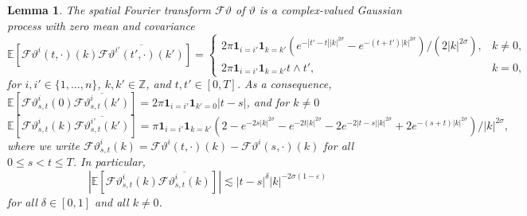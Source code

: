 \documentclass[11pt,a4paper]{article}
\newtheorem{lemma}[theorem]{Lemma}
\theoremstyle{remark}
\newcommand{\E}{\mathbb{E}}
\newcommand{\CF}{\ensuremath{\mathscr{F}}}
\begin{document}
\begin{lemma}\label{l:heat covariance}
   The spatial Fourier transform $\CF \vartheta$ of $\vartheta$ is a complex-valued Gaussian process with zero mean and covariance
   \begin{equation*}%
      \E[\CF{\vartheta}^i(t,\cdot)(k) \overline{\CF{\vartheta}^{i'}(t',\cdot)(k')}] = \begin{cases}
                                                                                                       2 \pi \mathbf{1}_{i=i'} \mathbf{1}_{k=k'} (e^{-|t'-t| | k |^{2 \sigma}} - e^{-(t+t')|k|^{2\sigma} })/(2|k|^{2 \sigma}), & k \neq 0,\\
                                                                                                       2\pi \mathbf{1}_{i=i'} \mathbf{1}_{k=k'} t \wedge t', & k = 0,
                                                                                                   \end{cases}
   \end{equation*}
   for $i,i' \in \{1, \dots, n\}$, $k, k' \in \mathbb{Z}$, and $t,t' \in [0,T]$. As a consequence, $\E[\CF{\vartheta}^i_{s,t}(0) \overline{\CF{\vartheta}^{i}_{s,t}(k')}] = 2\pi \mathbf{1}_{i=i'} \mathbf{1}_{k'=0} |t-s|$, and for $k\neq 0$
   \begin{equation*}
      \E[\CF{\vartheta}^i_{s,t}(k) \overline{\CF{\vartheta}^{i'}_{s,t}(k')}] = \pi \mathbf{1}_{i=i'} \mathbf{1}_{k=k'} (2 - e^{-2 s | k |^{2 \sigma}}  - e^{-2 t | k |^{2 \sigma}} - 2 e^{- 2 |t-s| |k|^{2\sigma}} + 2 e^{-(s+t)|k|^{2\sigma}})/|k|^{2 \sigma},
   \end{equation*}
   where we write $\CF{\vartheta}^i_{s,t}(k) = \CF{\vartheta}^i(t,\cdot)(k) - \CF{\vartheta}^i(s,\cdot)(k)$ for all $0 \leqslant s < t \leqslant T$. In particular,
   \begin{equation}
      |\E[\CF{\vartheta}^i_{s,t}(k) \overline{\CF{\vartheta}^{i}_{s,t}(k)}]| \lesssim |t-s|^{\delta} |k|^{-2\sigma(1 - \varepsilon)}
   \end{equation}
   for all $\delta \in [0,1]$ and all $k \neq 0$.
\end{lemma}
\end{document}

